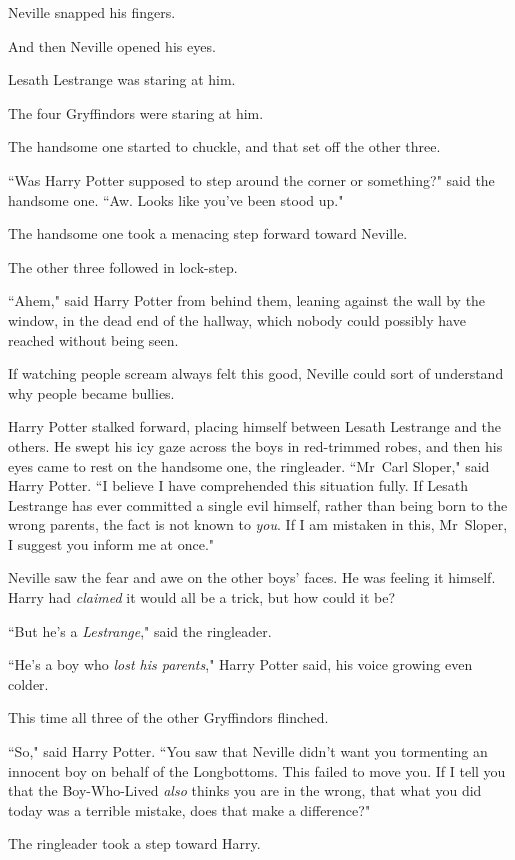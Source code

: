Neville snapped his fingers.

And then Neville opened his eyes.

Lesath Lestrange was staring at him.

The four Gryffindors were staring at him.

The handsome one started to chuckle, and that set off the other three.

``Was Harry Potter supposed to step around the corner or something?" said the handsome one. ``Aw. Looks like you've been stood up."

The handsome one took a menacing step forward toward Neville.

The other three followed in lock-step.

``Ahem," said Harry Potter from behind them, leaning against the wall by the window, in the dead end of the hallway, which nobody could possibly have reached without being seen.

If watching people scream always felt this good, Neville could sort of understand why people became bullies.

Harry Potter stalked forward, placing himself between Lesath Lestrange and the others. He swept his icy gaze across the boys in red-trimmed robes, and then his eyes came to rest on the handsome one, the ringleader. ``Mr~Carl Sloper," said Harry Potter. ``I believe I have comprehended this situation fully. If Lesath Lestrange has ever committed a single evil himself, rather than being born to the wrong parents, the fact is not known to \emph{you}. If I am mistaken in this, Mr~Sloper, I suggest you inform me at once."

Neville saw the fear and awe on the other boys' faces. He was feeling it himself. Harry had \emph{claimed} it would all be a trick, but how could it be?

``But he's a \emph{Lestrange}," said the ringleader.

``He's a boy who \emph{lost his parents}," Harry Potter said, his voice growing even colder.

This time all three of the other Gryffindors flinched.

``So," said Harry Potter. ``You saw that Neville didn't want you tormenting an innocent boy on behalf of the Longbottoms. This failed to move you. If I tell you that the Boy-Who-Lived \emph{also} thinks you are in the wrong, that what you did today was a terrible mistake, does that make a difference?"

The ringleader took a step toward Harry.


